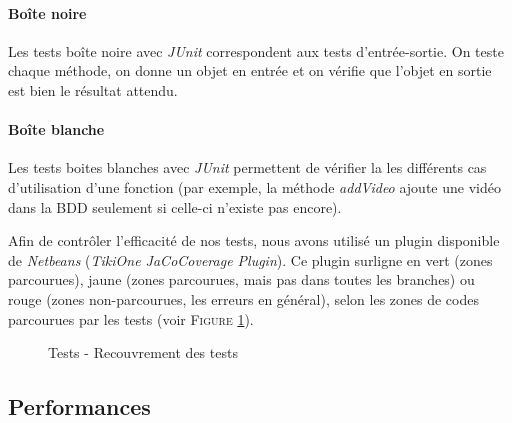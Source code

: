 \paragraph{Boîte noire}

Les tests boîte noire avec \textit{JUnit} correspondent aux tests d'entrée-sortie. On teste chaque méthode, on donne un objet en entrée et on vérifie que l'objet en sortie est bien le résultat attendu.

\paragraph{Boîte blanche}

Les tests boites blanches avec \textit{JUnit} permettent de vérifier la les différents cas d'utilisation d'une fonction (par exemple, la méthode \textit{addVideo} ajoute une vidéo dans la BDD seulement si celle-ci n'existe pas encore).


Afin de contrôler l'efficacité de nos tests, nous avons utilisé un plugin disponible de \textit{Netbeans} (\textit{TikiOne JaCoCoverage Plugin}). Ce plugin surligne en vert (zones parcourues), jaune (zones parcourues, mais pas dans toutes les branches) ou rouge (zones non-parcourues, les erreurs en général), selon les zones de codes parcourues par les tests (voir \textsc{Figure} \ref{cocojava}).

\begin{figure}[!ht]
\begin{center}
  \caption{Tests - Recouvrement des tests}
  \label{cocojava} 
\end{center}
\end{figure}


\subsection{Performances}


